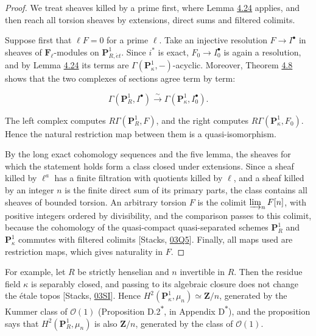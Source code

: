 \documentclass[11pt]{article}
\newcommand{\bpout}[1]{#1\textsuperscript{\hyperlink{bp-outside}{\ensuremath{\ast}}}}
\begin{document}
\begin{proof}[{Proof}]\label{bp72}%
We treat sheaves killed by a prime first, where Lemma \hyperref[bp68]{4.24} applies, and then reach all torsion sheaves by extensions, direct sums and filtered colimits.

Suppose first that \(\ell F=0\) for a prime \(\ell\).  Take an injective resolution \(F\to I^\bullet\) in sheaves of \(\mathbf F_\ell\)-modules on \(\mathbf P^1_{R,\acute{e}t}\). Since \(i^*\) is exact, \(F_0\to I_0^\bullet\) is again a resolution, and by Lemma \hyperref[bp68]{4.24} its terms are \(\Gamma(\mathbf P^1_\kappa,-)\)-acyclic. Moreover, Theorem \hyperref[bp24]{4.8} shows that the two complexes of sections agree term by term:

\[
\Gamma(\mathbf P^1_R,I^\bullet)\xrightarrow{\sim}
\Gamma(\mathbf P^1_\kappa,I_0^\bullet).
\]

The left complex computes \(R\Gamma(\mathbf P^1_R,F)\), and the right computes \(R\Gamma(\mathbf P^1_\kappa,F_0)\). Hence the natural restriction map between them is a quasi-isomorphism.

By the long exact cohomology sequences and the five lemma, the sheaves for which the statement holds form a class closed under extensions. Since a sheaf killed by \(\ell^a\) has a finite filtration with quotients killed by \(\ell\), and a sheaf killed by an integer \(n\) is the finite direct sum of its primary parts, the class contains all sheaves of bounded torsion. An arbitrary torsion \(F\) is the colimit \(\varinjlim_n F[n]\), with positive integers ordered by divisibility, and the comparison passes to this colimit, because the cohomology of the quasi-compact quasi-separated schemes \(\mathbf P^1_R\) and \(\mathbf P^1_\kappa\) commutes with filtered colimits [Stacks, \href{https://stacks.math.columbia.edu/tag/03Q5}{03Q5}]. Finally, all maps used are restriction maps, which gives naturality in \(F\).
\end{proof}

\label{bp73}%
For example, let \(R\) be strictly henselian and \(n\) invertible in \(R\). Then the residue field \(\kappa\) is separably closed, and passing to its algebraic closure does not change the étale topos [Stacks, \href{https://stacks.math.columbia.edu/tag/03SI}{03SI}]. Hence \(H^2(\mathbf P^1_\kappa,\mu_n)\simeq\mathbf Z/n\), generated by the Kummer class of \(\mathcal O(1)\) (Proposition \bpout{D.2}, in Appendix \bpout{D}), and the proposition says that \(H^2(\mathbf P^1_R,\mu_n)\) is also \(\mathbf Z/n\), generated by the class of \(\mathcal O(1)\).
\end{document}

